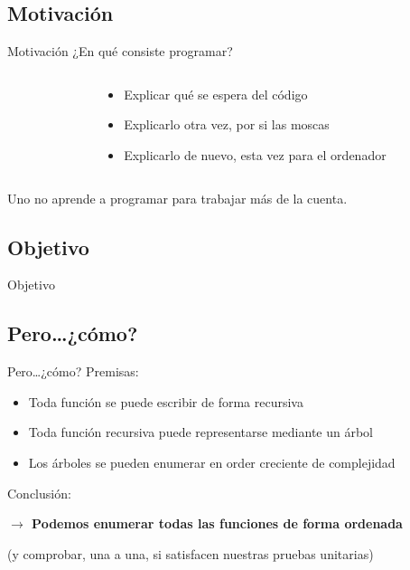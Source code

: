 \documentclass[xcolor=x11names,compress]{beamer}
\renewcommand{\(}{\begin{columns}}
\renewcommand{\)}{\end{columns}}
\newcommand{\<}[1]{\begin{column}{#1}}
\renewcommand{\>}{\end{column}}
\begin{document}
\subsection{Motivación}
\begin{frame}{Motivación}
    ¿En qué consiste programar?
    \begin{columns}
        \begin{column}{.5\linewidth}
        \begin{block}
            \codeFactorial
        \end{block}
        \end{column}
        \begin{column}{.5\linewidth}
            \begin{itemize}\itemsep25pt \pause
                \item Explicar qué se espera del código\pause
                \item Explicarlo otra vez, por si las moscas\pause
                \item Explicarlo de nuevo, esta vez para el ordenador\pause
            \end{itemize}
        \end{column}
    \end{columns}
    Uno no aprende a programar para trabajar más de la cuenta.
\end{frame}

\subsection{Objetivo}
\begin{frame}{Objetivo}
    \pause
    \codeFactorialTarget
\end{frame}


\subsection{Pero\ldots ¿cómo?}
\begin{frame}{Pero\ldots ¿cómo?}
    Premisas:
    \pause
    \begin{itemize}
        \item Toda función se puede escribir de forma recursiva \pause
        \item Toda función recursiva puede representarse mediante un árbol \pause
        \item Los árboles se pueden enumerar en order creciente de complejidad \pause
    \end{itemize}
    Conclusión:

    \textbf{$\rightarrow$ Podemos enumerar todas las funciones de forma ordenada} \pause

    (y comprobar, una a una, si satisfacen nuestras pruebas unitarias)
\end{frame}
\end{document}
